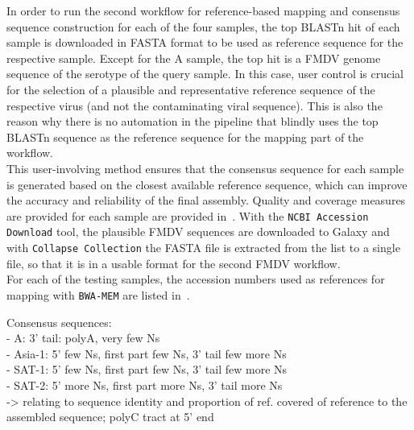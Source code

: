 In order to run the second workflow for reference-based mapping and consensus sequence construction for each of the four samples, the top \ac{BLAST}n hit of each sample is downloaded in FASTA format to be used as reference sequence for the respective sample. Except for the A sample, the top hit is a \ac{FMDV} genome sequence of the serotype of the query sample. In this case, user control is crucial for the selection of a plausible and representative reference sequence of the respective virus (and not the contaminating viral sequence). This is also the reason why there is no automation in the pipeline that blindly uses the top \ac{BLAST}n sequence as the reference sequence for the mapping part of the workflow.\\
This user-involving method ensures that the consensus sequence for each sample is generated based on the closest available reference sequence, which can improve the accuracy and reliability of the final assembly. Quality and coverage measures are provided for each sample are provided in~. With the \texttt{NCBI Accession Download} tool, the plausible \ac{FMDV} sequences are downloaded to Galaxy and with \texttt{Collapse Collection} the FASTA file is extracted from the list to a single file, so that it is in a usable format for the second \ac{FMDV} workflow.\\
For each of the testing samples, the accession numbers used as references for mapping with \texttt{BWA-MEM} are listed in~. 

Consensus sequences:\\
- A: 3' tail: polyA, very few Ns\\
- Asia-1: 5' few Ns, first part few Ns, 3' tail few more Ns\\
- SAT-1: 5' few Ns, first part few Ns, 3' tail few more Ns\\
- SAT-2: 5' more Ns, first part more Ns, 3'  tail more Ns\\
-> relating to sequence identity and proportion of ref. covered of reference to the assembled sequence; polyC tract at 5' end



